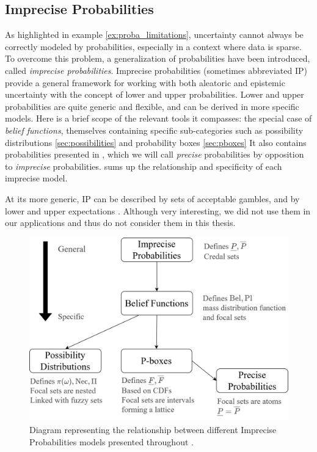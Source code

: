 \subsection{Imprecise Probabilities}\label{sec:imprecise_probabilities}
As highlighted in example \ref{ex:proba_limitations}, uncertainty cannot always be correctly modeled by probabilities, especially in a context where data is sparse. To overcome this problem, a generalization of probabilities have been introduced, called \textit{imprecise probabilities}. Imprecise probabilities (sometimes abbreviated IP) provide a general framework for working with both aleatoric and epistemic uncertainty with the concept of lower and upper probabilities. Lower and upper probabilities are quite  generic and flexible, and can be derived in more specific models. Here is a brief scope of the relevant tools it compasses: the special case of \textit{belief functions}, themselves containing specific sub-categories such as possibility distributions \ref{sec:possibilities} and probability boxes \ref{sec:pboxes} \etc{} It also contains probabilities presented in , which we will call \textit{precise} probabilities by opposition to \textit{imprecise} probabilities.  sums up the relationship and specificity of each imprecise model.

\begin{remark}
    At its more generic, IP can be described by sets of acceptable gambles, and by lower and upper expectations \cite{walley_statistical_1991,augustin_introduction_2014}. Although very interesting, we did not use them in our applications and thus do not consider them in this thesis.
\end{remark}
\begin{figure}[ht]
    {\centering
    \includegraphics[width=0.8\linewidth]{Images/Chap_2/Diagramme_IP_Bel.png}
    \caption{Diagram representing the relationship between different Imprecise Probabilities models presented throughout .}
    \label{fig:diagram_IP}}
\end{figure}

